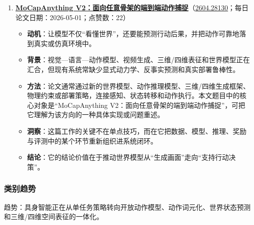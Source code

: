 \begin{enumerate}[leftmargin=1.5em]
\begin{itemize}[leftmargin=1.5em]
    \item \textbf{动机}：让模型不仅“看懂世界”，还要能预测行动后果，并把动作可靠地落到真实或仿真环境中。
    \item \textbf{背景}：视觉—语言—动作模型、视频生成、三维/四维表征和世界模型正在汇合，但现有系统常缺少显式动力学、反事实预测和真实部署鲁棒性。
    \item \textbf{方法}：论文通常通过新的世界模型、动作推理模型、三维/四维生成框架、物理约束或部署策略，连接感知、状态转移和动作执行。本文题目中的核心对象是“ExoActor：把外视角视频生成用于可泛化交互式人形控制”，可把它理解为该方向的一种具体实现或问题重述。
    \item \textbf{洞察}：生成模型的核心竞争正从单帧质量转向可控性、一致性和工作流可用性。
    \item \textbf{结论}：它的结论价值在于推动世界模型从“生成画面”走向“支持行动决策”。
  \end{itemize}
  \item \textbf{\href{https://huggingface.co/papers/2604.28130}{MoCapAnything V2：面向任意骨架的端到端动作捕捉}}（\href{https://arxiv.org/abs/2604.28130}{2604.28130}；每日论文日期：2026-05-01；点赞数：22）
  \begin{itemize}[leftmargin=1.5em]
    \item \textbf{动机}：让模型不仅“看懂世界”，还要能预测行动后果，并把动作可靠地落到真实或仿真环境中。
    \item \textbf{背景}：视觉—语言—动作模型、视频生成、三维/四维表征和世界模型正在汇合，但现有系统常缺少显式动力学、反事实预测和真实部署鲁棒性。
    \item \textbf{方法}：论文通常通过新的世界模型、动作推理模型、三维/四维生成框架、物理约束或部署策略，连接感知、状态转移和动作执行。本文题目中的核心对象是“MoCapAnything V2：面向任意骨架的端到端动作捕捉”，可把它理解为该方向的一种具体实现或问题重述。
    \item \textbf{洞察}：这篇工作的关键不在单点技巧，而在它把数据、模型、推理、奖励与评测中的某个环节重新组织进系统闭环。
    \item \textbf{结论}：它的结论价值在于推动世界模型从“生成画面”走向“支持行动决策”。
  \end{itemize}
\end{enumerate}

\subsubsection{类别趋势}
趋势：具身智能正在从单任务策略转向开放动作模型、动作词元化、世界状态预测和三维/四维空间表征的一体化。

